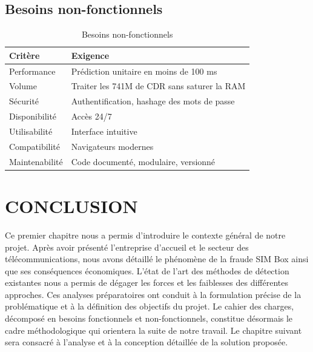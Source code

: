 \documentclass[12pt, oneside, a4paper]{report}
\begin{document}
\subsection{Besoins non-fonctionnels}
\begin{table}[h!]
\centering
\caption{Besoins non-fonctionnels}
\label{tab:bnf}
\vspace{0.5cm}
\renewcommand{\arraystretch}{1.3}
\begin{tabular}{|l|p{10cm}|}
\hline
\textbf{Critère} & \textbf{Exigence} \\
\hline
Performance & Prédiction unitaire en moins de 100 ms \\
\hline
Volume & Traiter les 741M de CDR sans saturer la RAM \\
\hline
Sécurité & Authentification, hashage des mots de passe \\
\hline
Disponibilité & Accès 24/7 \\
\hline
Utilisabilité & Interface intuitive \\
\hline
Compatibilité & Navigateurs modernes \\
\hline
Maintenabilité & Code documenté, modulaire, versionné \\
\hline
\end{tabular}
\end{table}

\section{CONCLUSION}
Ce premier chapitre nous a permis d'introduire le contexte général de notre projet. Après avoir présenté l'entreprise d'accueil et le secteur des télécommunications, nous avons détaillé le phénomène de la fraude SIM Box ainsi que ses conséquences économiques. L'état de l'art des méthodes de détection existantes nous a permis de dégager les forces et les faiblesses des différentes approches. Ces analyses préparatoires ont conduit à la formulation précise de la problématique et à la définition des objectifs du projet. Le cahier des charges, décomposé en besoins fonctionnels et non-fonctionnels, constitue désormais le cadre méthodologique qui orientera la suite de notre travail. Le chapitre suivant sera consacré à l'analyse et à la conception détaillée de la solution proposée.


\clearpage
\thispagestyle{fancy} %
\end{document}
